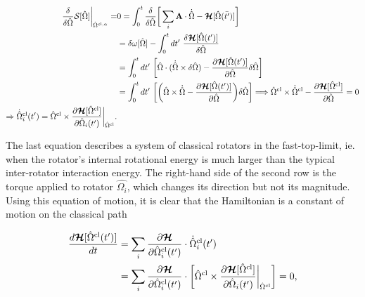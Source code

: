 \documentclass{homework}
\begin{document}
\begin{equation}
    \begin{split}
        \frac{\delta}{\delta \hat{\Omega}} \mathcal{S}[\hat{\Omega}] \bigg|_{\hat{\Omega}^{\textnormal{cl}, \alpha}} =& 0 = \int_{0}^{t}
        \frac{\delta}{\delta \hat{\Omega}} \bigg[\sum_{i} {\bf A} \cdot \dot{\hat{\Omega}} - \bm{\mathcal{H}}[{\hat{\Omega}}(\bar{t'})]\bigg] \\
        &= \delta \omega[\hat{\Omega}] - \int_0^t dt' \textnormal{ } \frac{\delta \bm{\mathcal{H}}[\hat{\Omega}({t'})]}{\delta \hat{\Omega}} \\
        &= \int_0^t dt' \textnormal{ } \bigg[{\hat{\Omega}} \cdot (\dot{\hat{\Omega}} \times \delta \hat{\Omega}) - \frac{\partial \bm{\mathcal{H}} [\hat{\Omega}({t'})]}{\partial \hat{\Omega}} \delta \hat{\Omega}\bigg] \\
        &= \int_0^t dt' \textnormal{ } \bigg[ \bigg({\hat{\Omega}} \times \dot{\hat{\Omega}} - \frac{\partial \bm{\mathcal{H}} [\hat{\Omega}({t'})]}{\partial \hat{\Omega}}\bigg )  \delta \hat{\Omega}\bigg] \Longrightarrow {\hat{\Omega}}^{\textnormal{cl}} \times \dot{\hat{\Omega}}^{\textnormal{cl}} - \frac{\partial \bm{\mathcal{H}} [\hat{\Omega}^{\textnormal{cl}}]}{\partial \hat{\Omega}} = 0 \\
        \Rightarrow \dot{\hat{\Omega}}^{\textnormal{cl}}_i (t') = \hat{\Omega}^{\textnormal{cl}} \times \frac{\partial \bm{\mathcal{H}} [\hat{\Omega}^{\textnormal{cl}}]}{\partial \hat{\Omega}_i(t')}\bigg|_{\hat{\Omega}^{\textnormal{cl}}}.
    \end{split}
\end{equation}

The last equation describes a system of classical rotators in the fast-top-limit, ie. when the rotator's internal rotational energy is much larger than the typical inter-rotator interaction energy. The right-hand side of the second row is the torque applied to rotator $\hat{\Omega_i}$, which changes its direction but not its magnitude. Using this equation of motion, it is clear that the Hamiltonian is a constant of motion on the classical path 

\begin{equation}
    \begin{split}
        \frac{d \bm{\mathcal{H}} [\hat{\Omega}^{\textnormal{cl}} (t')] }{dt} &= \sum_{i} \frac{\partial \bm{\mathcal{H}}}{\partial \hat{\Omega}_i^{\textnormal{cl}}(t')} \cdot \dot{\hat{\Omega}}_i^{\textnormal{cl}}(t') \\
        &= \sum_{i} \frac{\partial \bm{\mathcal{H}}}{\partial \hat{\Omega}_i^{\textnormal{cl}}(t')} \cdot \bigg[ \hat{\Omega}^{\textnormal{cl}} \times \frac{\partial \bm{\mathcal{H}} [\hat{\Omega}^{\textnormal{cl}}]}{\partial \hat{\Omega}_i(t')}\bigg|_{\hat{\Omega}^{\textnormal{cl}}} \bigg] = 0,
    \end{split}
\end{equation}
\end{document}
